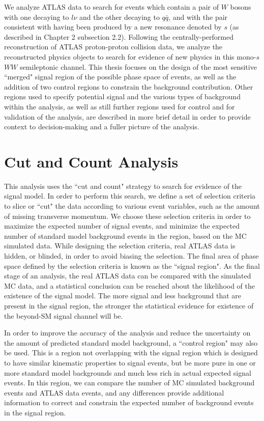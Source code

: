 \label{chapter:analysis}
We analyze ATLAS data to search for events which contain a pair of $W$ bosons with one decaying to $l\nu$ and the other decaying to $q\bar{q}$, and with the pair consistent with having been produced by a new resonance denoted by $s$ (as described in Chapter 2 subsection 2.2). Following the centrally-performed reconstruction of ATLAS proton-proton collision data, we analyze the reconstructed physics objects to search for evidence of new physics in this mono-$s$ \rightarrow\:$WW$ semileptonic channel. This thesis focuses on the design of the most sensitive ``merged" signal region of the possible phase space of events, as well as the addition of two control regions to constrain the \ttbar background contribution. Other regions used to specify potential signal and the various types of background within the analysis, as well as still further regions used for control and for validation of the analysis, are described in more brief detail in order to provide context to decision-making and a fuller picture of the analysis.

\section{Cut and Count Analysis}
This analysis uses the ``cut and count" strategy to search for evidence of the signal model. In order to perform this search, we define a set of selection criteria to slice or ``cut" the data according to various event variables, such as the amount of missing transverse momentum. We choose these selection criteria in order to maximize the expected number of signal events, and minimize the expected number of standard model background events in the region, based on the MC simulated data. While designing the selection criteria, real ATLAS data is hidden, or blinded, in order to avoid biasing the selection. The final area of phase space defined by the selection criteria is known as the ``signal region". As the final stage of an analysis, the real ATLAS data can be compared with the simulated MC data, and a statistical conclusion can be reached about the likelihood of the existence of the signal model. The more signal and less background that are present in the signal region, the stronger the statistical evidence for existence of the beyond-SM signal channel will be.

In order to improve the accuracy of the analysis and reduce the uncertainty on the amount of predicted standard model background, a ``control region" may also be used. This is a region not overlapping with the signal region which is designed to have similar kinematic properties to signal events, but be more pure in one or more standard model backgrounds and much less rich in actual expected signal events. In this region, we can compare the number of MC simulated background events and ATLAS data events, and any differences provide additional information to correct and constrain the expected number of background events in the signal region.

